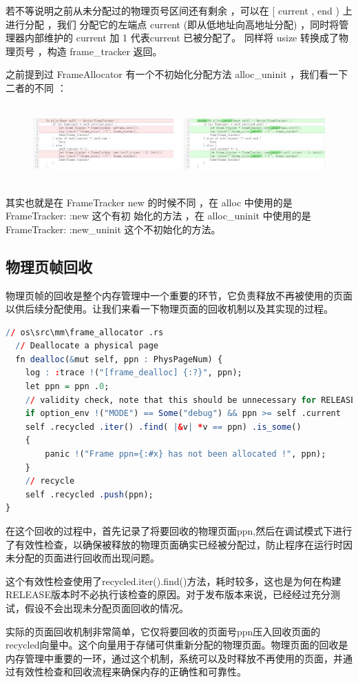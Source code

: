 \documentclass[12pt, a4paper]{ctexart}
\begin{document}
	若不等说明之前从未分配过的物理页号区间还有剩余 ，可以在 [  current ,  end ) 上进行分配 ，我们 分配它的左端点  current  (即从低地址向高地址分配)  ，同时将管理器内部维护的  current 加  1 代表current 已被分配了。  同样将  usize 转换成了物理页号 ，构造 frame\_tracker 返回。
	
	之前提到过 FrameAllocator 有⼀个不初始化分配方法 alloc\_uninit ，我们看一下二者的不同 ：
	\begin{figure}[h]
	  \centering
	  \includegraphics[width=14cm,height=3cm]{1.png}
	  \caption{ }
	\end{figure}
	
	其实也就是在 FrameTracker  new 的时候不同 ，在 alloc 中使用的是 FrameTracker: :new 这个有初 始化的方法 ，在 alloc\_uninit 中使用的是 FrameTracker: :new\_uninit 这个不初始化的方法。
	\subsection{物理页帧回收}
	物理页帧的回收是整个内存管理中一个重要的环节，它负责释放不再被使用的页面以供后续分配使用。让我们来看一下物理页面的回收机制以及其实现的过程。
	
\begin{lstlisting}[language=R]
  // os\src\mm\frame_allocator .rs
  // Deallocate a physical page
  fn dealloc(&mut self, ppn : PhysPageNum) {
    log : :trace !("[frame_dealloc] {:?}", ppn);
    let ppn = ppn .0;
    // validity check, note that this should be unnecessary for RELEASE build and it
    if option_env !("MODE") == Some("debug") && ppn >= self .current
    self .recycled .iter() .find( |&v| *v == ppn) .is_some()
    {
    	panic !("Frame ppn={:#x} has not been allocated !", ppn);
    }
    // recycle
    self .recycled .push(ppn);
}
\end{lstlisting}
  
  在这个回收的过程中，首先记录了将要回收的物理页面ppn,然后在调试模式下进行了有效性检查，以确保被释放的物理页面确实已经被分配过，防止程序在运行时因未分配的页面进行回收而出现问题。
  
  这个有效性检查使用了recycled.iter().find()方法，耗时较多，这也是为何在构建RELEASE版本时不必执行该检查的原因。对于发布版本来说，已经经过充分测试，假设不会出现未分配页面回收的情况。
  
  实际的页面回收机制非常简单，它仅将要回收的页面号ppn压入回收页面的recycled向量中。这个向量用于存储可供重新分配的物理页面。物理页面的回收是内存管理中重要的一环，通过这个机制，系统可以及时释放不再使用的页面，并通过有效性检查和回收流程来确保内存的正确性和可靠性。
\end{document}
